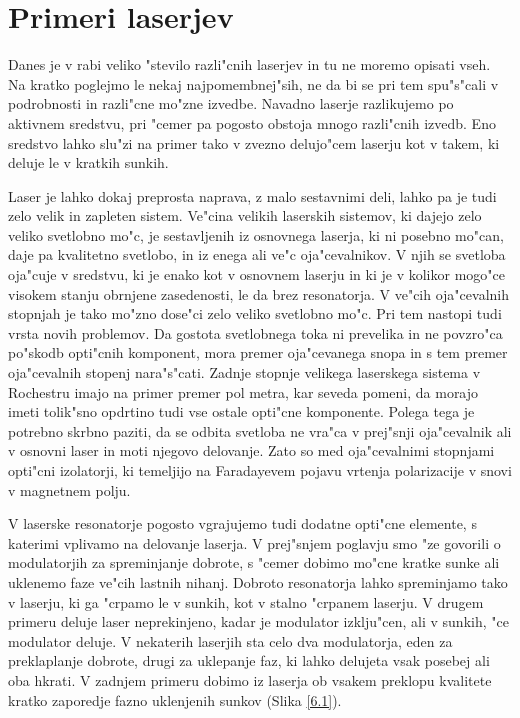 \chapter{Primeri laserjev}

Danes je v rabi veliko "stevilo razli"cnih laserjev in tu ne moremo opisati
vseh. Na kratko poglejmo le nekaj najpomembnej"sih, ne da bi se pri tem
spu"s"cali v podrobnosti in razli"cne mo"zne izvedbe. Navadno laserje
razlikujemo po aktivnem sredstvu, pri "cemer pa pogosto obstoja mnogo
razli"cnih izvedb. Eno sredstvo lahko slu"zi na primer tako v zvezno
delujo"cem laserju kot v takem, ki deluje le v kratkih sunkih.

Laser je lahko dokaj preprosta naprava, z malo sestavnimi deli, lahko pa je
tudi zelo velik in zapleten sistem. Ve"cina velikih laserskih sistemov, ki
dajejo zelo veliko svetlobno mo"c, je sestavljenih iz osnovnega laserja, ki
ni posebno mo"can, daje pa kvalitetno svetlobo, in iz enega ali ve"c
oja"cevalnikov. V njih se svetloba oja"cuje v sredstvu, ki je enako kot v
osnovnem laserju in ki je v kolikor mogo"ce visokem stanju obrnjene
zasedenosti, le da brez resonatorja. V ve"cih oja"cevalnih stopnjah je tako
mo"zno dose"ci zelo veliko svetlobno mo"c. Pri tem nastopi tudi vrsta novih
problemov. Da gostota svetlobnega toka ni prevelika in ne povzro"ca po"skodb
opti"cnih komponent, mora premer oja"cevanega snopa in s tem premer
oja"cevalnih stopenj nara"s"cati. Zadnje stopnje velikega laserskega sistema
v Rochestru imajo na primer premer pol metra, kar seveda pomeni, da morajo
imeti tolik"sno opdrtino tudi vse ostale opti"cne komponente. Polega tega je
potrebno skrbno paziti, da se odbita svetloba ne vra"ca v prej"snji
oja"cevalnik ali v osnovni laser in moti njegovo delovanje. Zato so med
oja"cevalnimi stopnjami opti"cni izolatorji, ki temeljijo na Faradayevem
pojavu vrtenja polarizacije v snovi v magnetnem polju.

V laserske resonatorje pogosto vgrajujemo tudi dodatne opti"cne elemente, s
katerimi vplivamo na delovanje laserja. V prej"snjem poglavju smo "ze
govorili o modulatorjih za spreminjanje dobrote, s "cemer dobimo mo"cne
kratke sunke ali uklenemo faze ve"cih lastnih nihanj. Dobroto resonatorja
lahko spreminjamo tako v laserju, ki ga "crpamo le v sunkih, kot v stalno
"crpanem laserju. V drugem primeru deluje laser neprekinjeno, kadar je
modulator izklju"cen, ali v sunkih, "ce modulator deluje. V nekaterih
laserjih sta celo dva modulatorja, eden za preklaplanje dobrote, drugi za
uklepanje faz, ki lahko delujeta vsak posebej ali oba hkrati. V zadnjem
primeru dobimo iz laserja ob vsakem preklopu kvalitete kratko zaporedje
fazno uklenjenih sunkov (Slika \ref{6.1}).

